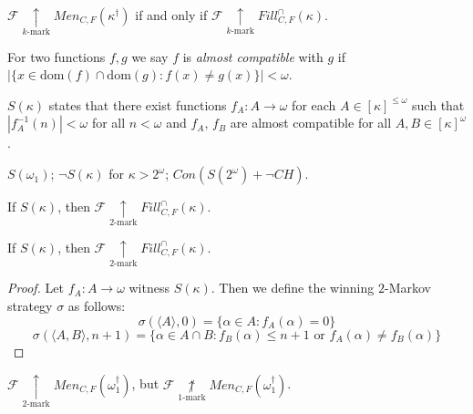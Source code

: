 \documentclass{beamer}
\theoremstyle{definition}
\newcommand{\kmarkwin}[1]{\underset{#1\text{-mark}}{\uparrow}}
\newcommand{\notkmarkwin}[1]{\underset{#1\text{-mark}}{\not\uparrow}}
\newcommand{\oneptlind}[1]{#1^\dagger}
\newcommand{\mengame}[1]{Men_{C,F}(#1)}
\newcommand{\fillgameInt}[1]{Fill^{\cap}_{C,F}(#1)}
\newcommand{\<}{\langle}
\renewcommand{\>}{\rangle}
\newcommand{\dom}{\textrm{dom}}
\newcommand{\alcompS}[1]{S(#1)}
\newcommand{\pl}[1]{\mathscr{#1}}
\newcommand{\term}{\textit}
\begin{document}
\begin{frame}
  \begin{theorem}
    $\pl F \kmarkwin{k} \mengame{\oneptlind\kappa}$ if and only if
    $\pl F \kmarkwin{k} \fillgameInt\kappa$.
  \end{theorem}
  \pause
  \begin{definition}
    For two functions $f,g$ we say $f$ is \term{almost compatible} with
    $g$ if $|\{x\in\dom(f)\cap\dom(g):f(x)\not=g(x)\}|<\omega$.
  \end{definition}
  \pause
  \begin{definition}
    $\alcompS\kappa$ states that there exist functions
    $f_A:A\to\omega$ for each $A\in[\kappa]^{\leq\omega}$ such that
    $|f_A^{-1}(n)|<\omega$ for all $n<\omega$ and
    $f_A$, $f_B$ are almost compatible for all $A,B\in[\kappa]^\omega$.
  \end{definition}
\end{frame}

\begin{frame}
  \begin{theorem}[Scheepers 1991]
    $\alcompS{\omega_1}$;
    $\neg\alcompS\kappa$ for $\kappa>2^\omega$;
    $Con(\alcompS{2^\omega}+\neg CH)$.
  \end{theorem}

  \pause

  \begin{theorem}
    If $\alcompS\kappa$, then $\pl F\kmarkwin{2} \fillgameInt\kappa$.
  \end{theorem}
\end{frame}

\begin{frame}

  \begin{theorem}
    If $\alcompS\kappa$, then $\pl F\kmarkwin{2} \fillgameInt\kappa$.
  \end{theorem}

  \begin{proof}
    Let $f_A:A\to\omega$ witness $\alcompS\kappa$. Then we define the
    winning $2$-Markov strategy $\sigma$ as follows:
      \[
        \sigma(\<A\>,0) = \{\alpha\in A: f_A(\alpha) = 0\}
      \]
      \[
        \sigma(\<A,B\>,n+1)
          =
        \{\alpha\in A\cap B
          :
        f_B(\alpha) \leq n+1
          \text{ or }
        f_A(\alpha)\not=f_B(\alpha)\}
      \]
  \end{proof}

  \pause

  \begin{corollary}
    $\pl F\kmarkwin{2}\mengame{\oneptlind\omega_1}$, but
    $\pl F\notkmarkwin1\mengame{\oneptlind\omega_1}$.
  \end{corollary}
\end{frame}
\end{document}
